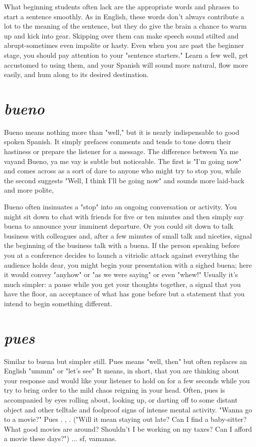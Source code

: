\documentclass[14pt,a4paper,oneside]{memoir}
\begin{document}
What beginning students often lack are the appropriate words
and phrases to start a sentence smoothly. As in English, these words
don't always contribute a lot to the meaning of the sentence, but they
do give the brain a chance to warm up and kick into gear. Skipping
over them can make speech sound stilted and abrupt-sometimes
even impolite or hasty. Even when you are past the beginner stage, you
should pay attention to your "sentence starters." Learn a few well, get
accustomed to using them, and your Spanish will sound more natural,
flow more easily, and hum along to its desired destination.

\section{\emph{bueno}}

Bueno means nothing more than "well," but it is nearly indispensable to good spoken Spanish. It simply prefaces comments and tends
to tone down their hastiness or prepare the listener for a message. The
difference between Ya me vayand Bueno, ya me vay is subtle but noticeable. The first is "I'm going now" and comes across as a sort of dare
to anyone who might try to stop you, while the second suggests "Well,
I think I'll be going now" and sounds more laid-back and more polite,

Bueno often insinuates a "stop" into an ongoing conversation
or activity. You might sit down to chat with friends for five or ten minutes and then simply say buena to announce your imminent departure. Or you could sit down to talk business with colleagues and, after
a few minutes of small talk and niceties, signal the beginning of the
business talk with a buena. If the person speaking before you at a conference decides to launch a vitriolic attack against everything the audience holds dear, you might begin your presentation with a sighed
buena; here it would convey "anyhow" or "as we were saying" or
even "whew!" Usually it's much simpler: a pause while you get your
thoughts together, a signal that you have the floor, an acceptance of
what has gone before but a statement that you intend to begin something different.

\section{\emph{pues}}

Similar to buena but simpler still. Pues means "well, then"
but often replaces an English "ummm" or "let's see" It means, in
short, that you are thinking about your response and would like your
listener to hold on for a few seconds while you try to bring order to the
mild chaos reigning in your head. Often, pues is accompanied by eyes
rolling about, looking up, or darting off to some distant object and
other telltale and foolproof signs of intense mental activity. "Wanna
go to a movie?" Pues . , . ("Will it mean staying out late? Can I find a
baby-sitter? What good movies are around? Shouldn't I be working on
my taxes? Can I afford a movie these days?") ... sf, vamanas.
\end{document}

